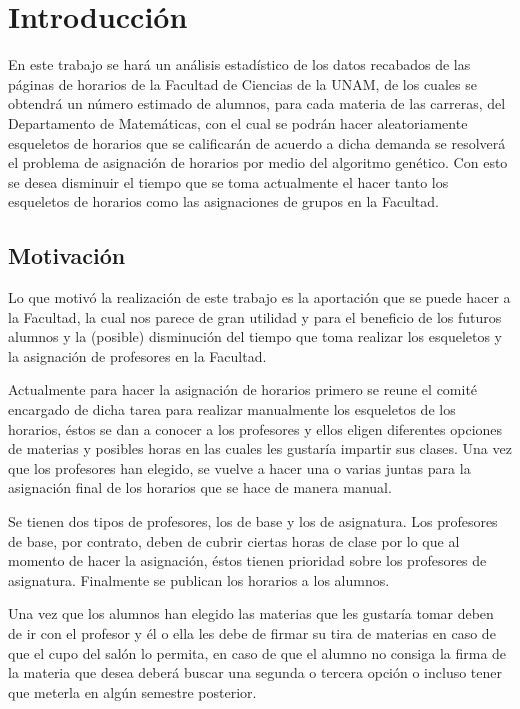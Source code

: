 \chapter{Introducción}

En este trabajo se hará un análisis estadístico de los datos recabados de las páginas de horarios de la Facultad de Ciencias de la UNAM, de los cuales se obtendrá un número estimado de alumnos, para cada materia de las carreras, del Departamento de Matemáticas, con el cual se podrán hacer aleatoriamente esqueletos de horarios que se calificarán de acuerdo a dicha demanda se resolverá el problema de asignación de horarios por medio del algoritmo genético. Con esto se desea disminuir el tiempo que se toma actualmente el hacer tanto los esqueletos de horarios como las asignaciones de grupos en la Facultad.

\section{Motivación}

Lo que motivó la realización de este trabajo es la aportación que se puede hacer a la Facultad, la cual nos parece de gran utilidad y para el beneficio de los futuros alumnos y la (posible) disminución del tiempo que toma realizar los esqueletos y la asignación de profesores en la Facultad.

Actualmente para hacer la asignación de horarios primero se reune el comité encargado de dicha tarea para realizar manualmente los esqueletos de los horarios, éstos se dan a conocer a los profesores y ellos eligen diferentes opciones de materias y posibles horas en las cuales les gustaría impartir sus clases. Una vez que los profesores han elegido, se vuelve a hacer una o varias juntas para la asignación final de los horarios que se hace de manera manual.

Se tienen dos tipos de profesores, los de base y los de asignatura. Los profesores de base, por contrato, deben de cubrir ciertas horas de clase por lo que al momento de hacer la asignación, éstos tienen prioridad sobre los profesores de asignatura. Finalmente se publican los horarios a los alumnos.

Una vez que los alumnos han elegido las materias que les gustaría tomar deben de ir con el profesor y él o ella les debe de firmar su tira de materias en caso de que el cupo del salón lo permita, en caso de que el alumno no consiga la firma de la materia que desea deberá buscar una segunda o tercera opción o incluso tener que meterla en algún semestre posterior.

